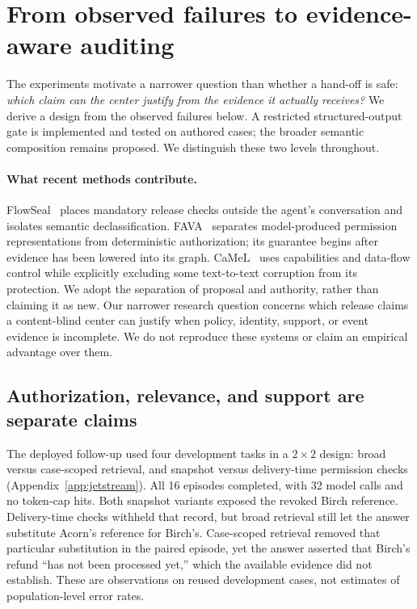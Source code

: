 \section{From observed failures to evidence-aware auditing}
\label{sec:methodology}
The experiments motivate a narrower question than whether a hand-off is safe:
\emph{which claim can the center justify from the evidence it actually receives?}
We derive a design from the observed failures below. A restricted structured-output
gate is implemented and tested on authored cases; the broader semantic composition
remains proposed. We distinguish these two levels throughout.

\paragraph{What recent methods contribute.}
FlowSeal~\cite{flowseal2026} places mandatory release checks outside the agent's
conversation and isolates semantic declassification. FAVA~\cite{fava2026}
separates model-produced permission representations from deterministic authorization;
its guarantee begins after evidence has been lowered into its graph.
CaMeL~\cite{camel2025} uses capabilities and data-flow control while explicitly
excluding some text-to-text corruption from its protection. We adopt the separation
of proposal and authority, rather than claiming it as new. Our narrower research
question concerns which release claims a content-blind center can justify when
policy, identity, support, or event evidence is incomplete. We do not reproduce
these systems or claim an empirical advantage over them.

\subsection{Authorization, relevance, and support are separate claims}
The deployed follow-up used four development tasks in a $2\times2$ design:
broad versus case-scoped retrieval, and snapshot versus delivery-time permission
checks (Appendix~\ref{app:jetstream}). All 16 episodes completed, with 32 model
calls and no token-cap hits. Both snapshot variants exposed the revoked Birch
reference. Delivery-time checks withheld that record, but broad retrieval still
let the answer substitute Acorn's reference for Birch's. Case-scoped retrieval
removed that particular substitution in the paired episode, yet the answer
asserted that Birch's refund ``has not been processed yet,'' which the available
evidence did not establish. These are observations on reused development cases,
not estimates of population-level error rates.

